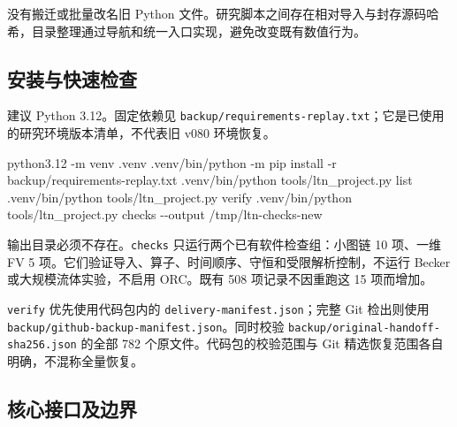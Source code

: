 \documentclass[
  10pt,
  a4paper,
]{article}
\newenvironment{Shaded}{}{}
\newcommand{\AttributeTok}[1]{\textcolor[rgb]{0.49,0.56,0.16}{#1}}
\newcommand{\ExtensionTok}[1]{#1}
\newcommand{\NormalTok}[1]{#1}
\begin{document}
没有搬迁或批量改名旧 Python
文件。研究脚本之间存在相对导入与封存源码哈希，目录整理通过导航和统一入口实现，避免改变既有数值行为。

\subsection{安装与快速检查}\label{ux5b89ux88c5ux4e0eux5febux901fux68c0ux67e5}

建议 Python 3.12。固定依赖见
\nolinkurl{backup/requirements-replay.txt}；它是已使用的研究环境版本清单，不代表旧
v080 环境恢复。

\begin{Shaded}
\begin{Highlighting}[]
\ExtensionTok{python3.12} \AttributeTok{{-}m}\NormalTok{ venv .venv}
\ExtensionTok{.venv/bin/python} \AttributeTok{{-}m}\NormalTok{ pip install }\AttributeTok{{-}r}\NormalTok{ backup/requirements{-}replay.txt}
\ExtensionTok{.venv/bin/python}\NormalTok{ tools/ltn\_project.py list}
\ExtensionTok{.venv/bin/python}\NormalTok{ tools/ltn\_project.py verify}
\ExtensionTok{.venv/bin/python}\NormalTok{ tools/ltn\_project.py checks }\AttributeTok{{-}{-}output}\NormalTok{ /tmp/ltn{-}checks{-}new}
\end{Highlighting}
\end{Shaded}

输出目录必须不存在。\nolinkurl{checks} 只运行两个已有软件检查组：小图链
10 项、一维 FV 5
项。它们验证导入、算子、时间顺序、守恒和受限解析控制，不运行 Becker
或大规模流体实验，不启用 ORC。既有 508 项记录不因重跑这 15 项而增加。

\nolinkurl{verify} 优先使用代码包内的
\nolinkurl{delivery-manifest.json}；完整 Git 检出则使用
\nolinkurl{backup/github-backup-manifest.json}。同时校验
\nolinkurl{backup/original-handoff-sha256.json} 的全部 782
个原文件。代码包的校验范围与 Git 精选恢复范围各自明确，不混称全量恢复。

\subsection{核心接口及边界}\label{ux6838ux5fc3ux63a5ux53e3ux53caux8fb9ux754c}
\end{document}
